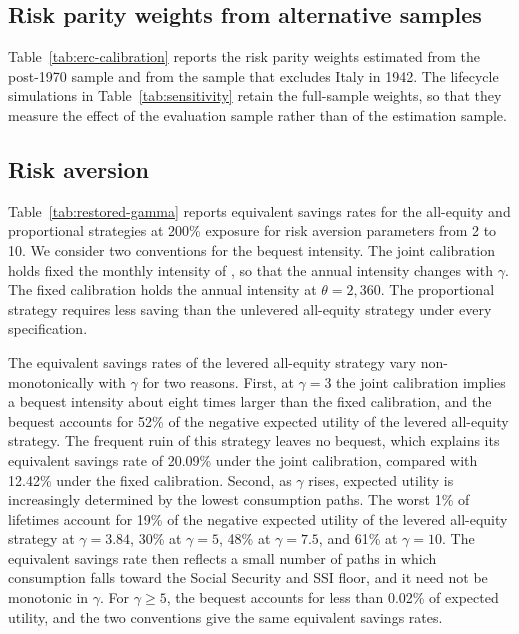 



\subsection{Risk parity weights from alternative samples}
\label{app:erc-calibration}

Table~\ref{tab:erc-calibration} reports the risk parity weights estimated from the post-1970 sample and
from the sample that excludes Italy in 1942. The lifecycle simulations in Table~\ref{tab:sensitivity} retain
the full-sample weights, so that they measure the effect of the evaluation sample rather than of the
estimation sample.



\subsection{Risk aversion}
\label{app:gamma-sensitivity}

Table~\ref{tab:restored-gamma} reports equivalent savings rates for the all-equity and proportional
strategies at 200\% exposure for risk aversion parameters from 2 to 10. We consider two conventions for
the bequest intensity. The joint calibration holds fixed the monthly intensity of
\citet{AnarkulovaCederburgODoherty2025}, so that the annual intensity changes with $\gamma$. The fixed
calibration holds the annual intensity at $\theta=2{,}360$. The proportional strategy requires less
saving than the unlevered all-equity strategy under every specification.

The equivalent savings rates of the levered all-equity strategy vary non-monotonically with $\gamma$ for
two reasons. First, at $\gamma=3$ the joint calibration implies a bequest intensity about eight times
larger than the fixed calibration, and the bequest accounts for 52\% of the negative expected utility of the
levered all-equity strategy. The frequent ruin of this strategy leaves no bequest, which explains its
equivalent savings rate of 20.09\% under the joint calibration, compared with 12.42\% under the fixed
calibration. Second, as $\gamma$ rises, expected utility is increasingly determined by the lowest
consumption paths. The worst 1\% of lifetimes account for 19\% of the negative expected utility of the
levered all-equity strategy at $\gamma=3.84$, 30\% at $\gamma=5$, 48\% at $\gamma=7.5$, and 61\% at
$\gamma=10$. The equivalent savings rate then reflects a small number of paths in which consumption falls
toward the Social Security and SSI floor, and it need not be monotonic in $\gamma$. For $\gamma\geq5$, the
bequest accounts for less than 0.02\% of expected utility, and the two conventions give the same
equivalent savings rates.

